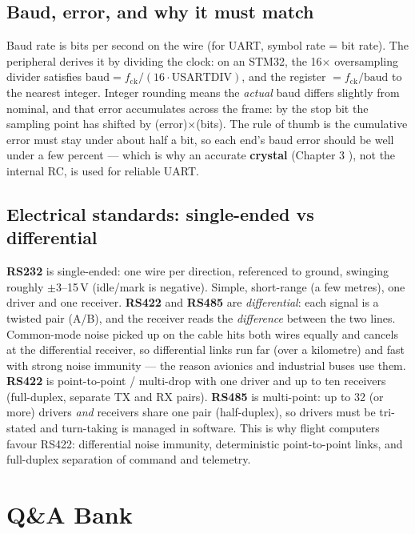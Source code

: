 \subsection{Baud, error, and why it must match}

Baud rate is bits per second on the wire (for UART, symbol rate = bit rate).
The peripheral derives it by dividing the clock: on an STM32, the 16$\times$
oversampling divider  satisfies
$\text{baud}=f_{\text{ck}}/(16\cdot\text{USARTDIV})$, and the register
$=f_{\text{ck}}/\text{baud}$ to the nearest integer. Integer rounding
means the \emph{actual} baud differs slightly from nominal, and that error
accumulates across the frame: by the stop bit the sampling point has shifted by
(error)$\times$(bits). The rule of thumb is the cumulative error must stay
under about half a bit, so each end's baud error should be well under a few
percent --- which is why an accurate \textbf{crystal} (Chapter 3 ),
not the internal RC, is used for reliable UART.

\subsection{Electrical standards: single-ended vs differential}

\textbf{RS232} is single-ended: one wire per direction, referenced to ground,
swinging roughly $\pm$3--15\,V (idle/mark is negative). Simple, short-range
(a few metres), one driver and one receiver. \textbf{RS422} and \textbf{RS485}
are \emph{differential}: each signal is a twisted pair (A/B), and the receiver
reads the \emph{difference} between the two lines. Common-mode noise picked up
on the cable hits both wires equally and cancels at the differential receiver,
so differential links run far (over a kilometre) and fast with strong noise
immunity --- the reason avionics and industrial buses use them. \textbf{RS422}
is point-to-point / multi-drop with one driver and up to ten receivers
(full-duplex, separate TX and RX pairs). \textbf{RS485} is multi-point: up to
32 (or more) drivers \emph{and} receivers share one pair (half-duplex), so
drivers must be tri-stated and turn-taking is managed in software. This is why
flight computers favour RS422: differential noise immunity, deterministic
point-to-point links, and full-duplex separation of command and telemetry.

\section{Q\&A Bank}

